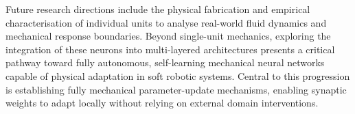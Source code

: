 \documentclass[11pt,a4paper]{article}
\numberwithin{equation}{section}
\begin{document}
Future research directions include the physical fabrication and empirical characterisation of individual units to
analyse real-world fluid dynamics and mechanical response boundaries. Beyond single-unit mechanics, exploring the
integration of these neurons into multi-layered architectures presents a critical pathway toward fully autonomous,
self-learning mechanical neural networks capable of physical adaptation in soft robotic systems. Central to this
progression is establishing fully mechanical parameter-update mechanisms, enabling synaptic weights to adapt locally
without relying on external domain interventions.




\clearpage
\end{document}
